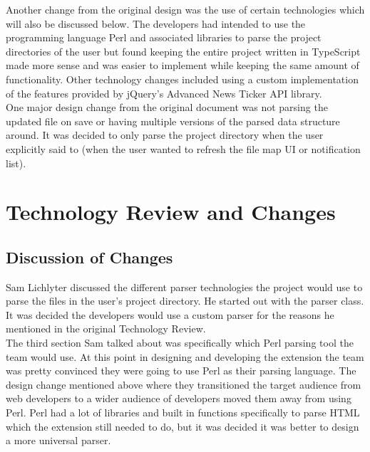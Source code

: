 \documentclass[letterpaper,10pt,titlepage,draftclsnofoot,onecolumn,onesided] {IEEEtran}
\begin{document}
Another change from the original design was the use of certain technologies which will also be discussed below.
The developers had intended to use the programming language Perl and associated libraries to parse the project directories of the user but found keeping the entire project written in TypeScript made more sense and was easier to implement while keeping the same amount of functionality. 
Other technology changes included using a custom implementation of the features provided by jQuery's Advanced News Ticker API library.\\

One major design change from the original document was not parsing the updated file on save or having multiple versions of the parsed data structure around.
It was decided to only parse the project directory when the user explicitly said to (when the user wanted to refresh the file map UI or notification list). \\

\section{Technology Review and Changes}

\subsection{Discussion of Changes}
Sam Lichlyter discussed the different parser technologies the project would use to parse the files in the user's project directory.
He started out with the parser class.
It was decided the developers would use a custom parser for the reasons he mentioned in the original Technology Review. \\

The third section Sam talked about was specifically which Perl parsing tool the team would use.
At this point in designing and developing the extension the team was pretty convinced they were going to use Perl as their parsing language.
The design change mentioned above where they transitioned the target audience from web developers to a wider audience of developers moved them away from using Perl.
Perl had a lot of libraries and built in functions specifically to parse HTML which the extension still needed to do, but it was decided it was better to design a more universal parser.\\
\end{document}
